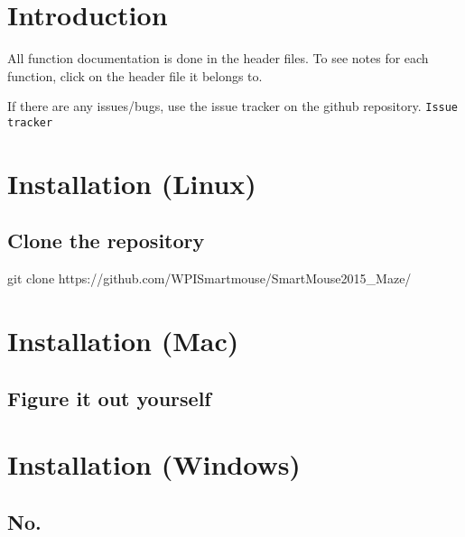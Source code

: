 \section{Introduction}\label{index_intro_sec}
All function documentation is done in the header files. To see notes for each function, click on the header file it belongs to.

If there are any issues/bugs, use the issue tracker on the github repository. {\tt Issue tracker}\section{Installation (\-Linux)}\label{index_install_sec_linux}
\subsection{Clone the repository}\label{index_step1_linux}
\begin{DoxyVerb} git clone https://github.com/WPISmartmouse/SmartMouse2015_Maze/
\end{DoxyVerb}
\section{Installation (\-Mac)}\label{index_install_sec_mac}
\subsection{Figure it out yourself}\label{index_step1_mac}
\section{Installation (\-Windows)}\label{index_install_sec_win}
\subsection{No.}\label{index_step1_win}
